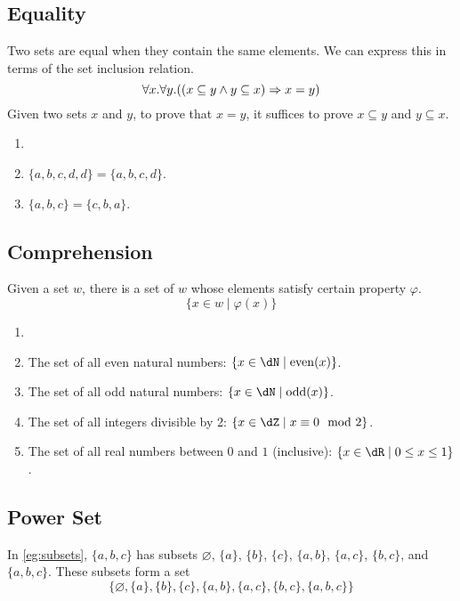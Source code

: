 \documentclass{amsart}
\begin{document}
\subsection{Equality}
\label{sec:equality}

Two sets are equal when they contain the same elements.
We can express this in terms of the set inclusion relation.
\[
  \forall x. \forall y. ((x \subseteq y \wedge y \subseteq x) \Rightarrow x = y)
\]
Given two sets $x$ and $y$, to prove that $x = y$, it suffices to prove $x \subseteq y$ and $y \subseteq x$.

\begin{eg}
  \begin{enumerate}
  \item[]
  \item $\{a,b,c,d,d\} = \{a,b,c,d\}$.
  \item $\{a,b,c\} = \{c,b,a\}$.
  \end{enumerate}
\end{eg}

\subsection{Comprehension}
\label{sec:comprehension}

Given a set $w$, there is a set of $w$ whose elements satisfy certain property $\varphi$.
\[
  \{ x \in w \mid \varphi(x) \}
\]

\begin{eg}
  \begin{enumerate}
  \item[]
  \item The set of all even natural numbers: $\{ x \in \dN \mid \mathrm{even}(x) \}$.
  \item The set of all odd natural numbers: $\{ x \in \dN \mid \mathrm{odd}(x) \}$.
  \item The set of all integers divisible by 2: $\{ x \in \dZ \mid x \cng 0 \mod 2 \}$.
  \item The set of all real numbers between $0$ and $1$ (inclusive): $\{ x \in \dR \mid 0 \leq x \leq 1 \}$.
  \end{enumerate}
\end{eg}

\subsection{Power Set}
\label{sec:power-set}

In \cref{eg:subsets}, $\{ a,b,c \}$ has subsets $\varnothing$, $\{ a \}$, $\{ b \}$, $\{ c \}$, $\{ a,b \}$, $\{ a,c \}$, $\{ b,c \}$, and $\{ a,b,c \}$.
These subsets form a set
\[
  \{ \varnothing, \{ a \}, \{ b \}, \{ c \}, \{ a,b \}, \{ a,c \}, \{ b,c \}, \{ a,b,c \} \}
\]
\end{document}
